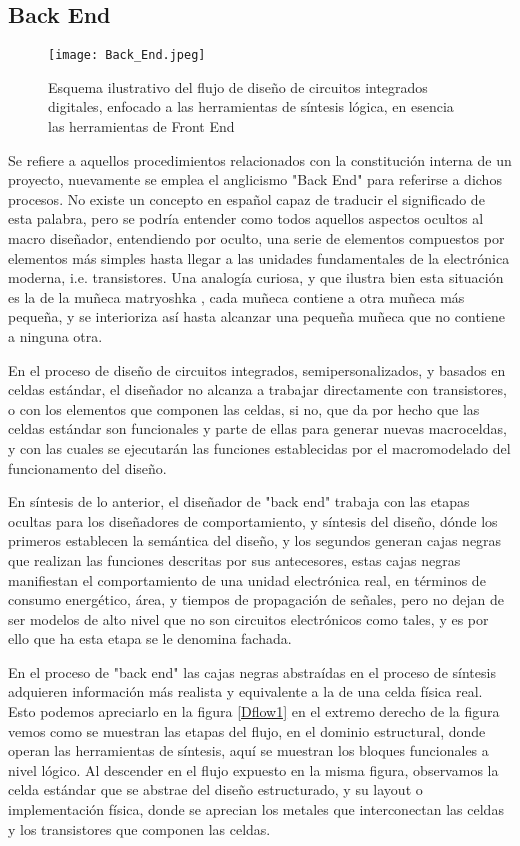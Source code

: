 \newpage
\subsection{Back End}

\begin{figure}[h]
\texttt{[image: Back\_End.jpeg]}
\centering
\caption{Esquema ilustrativo del flujo de diseño de circuitos integrados digitales, enfocado a las herramientas de síntesis lógica, en esencia las herramientas de Front End}
\label{be}
\end{figure}

Se refiere a aquellos procedimientos relacionados con la constitución interna de un proyecto, nuevamente se emplea el anglicismo "Back End" para referirse a dichos procesos. No existe un concepto en español capaz de traducir el significado de esta palabra, pero se podría entender como todos aquellos aspectos ocultos al macro diseñador, entendiendo por oculto, una serie de elementos compuestos por elementos más simples hasta llegar a las unidades fundamentales de la electrónica moderna, i.e. transistores. Una analogía curiosa, y que ilustra bien esta situación es la de la muñeca matryoshka \cite{book:matryoshka}, cada muñeca contiene a otra muñeca más pequeña, y se interioriza así hasta alcanzar una pequeña muñeca que no contiene a ninguna otra.

En el proceso de diseño de circuitos integrados, semipersonalizados, y basados en celdas estándar, el diseñador no alcanza a trabajar directamente con transistores, o con los elementos que componen las celdas, si no, que da por hecho que las celdas estándar son funcionales y parte de ellas para generar nuevas macroceldas, y con las cuales se ejecutarán las funciones establecidas por el macromodelado del funcionamento del diseño.

En síntesis de lo anterior, el diseñador de "back end" trabaja con las etapas ocultas para los diseñadores de comportamiento, y síntesis del diseño, dónde los primeros establecen la semántica del diseño, y los segundos generan cajas negras que realizan las funciones descritas por sus antecesores, estas cajas negras manifiestan el comportamiento de una unidad electrónica real, en términos de consumo energético, área, y tiempos de propagación de señales, pero no dejan de ser modelos de alto nivel que no son circuitos electrónicos como tales, y es por ello que ha esta etapa se le denomina fachada.

En el proceso de "back end" las cajas negras abstraídas en el proceso de síntesis adquieren información más realista y equivalente a la de una celda física real. Esto podemos apreciarlo en la figura \ref{Dflow1} en el extremo derecho de la figura vemos como se muestran las etapas del flujo, en el dominio estructural, donde operan las herramientas de síntesis, aquí se muestran los bloques funcionales a nivel lógico. Al descender en el flujo expuesto en la misma figura, observamos la celda estándar que se abstrae del diseño estructurado, y su layout o implementación física, donde se aprecian los metales que interconectan las celdas y los transistores que componen las celdas.

